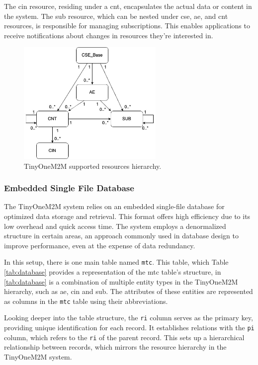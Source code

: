 \documentclass[a4paper,fleqn]{cas-dc}
\begin{document}
The \gls{cin} resource, residing under a \gls{cnt}, encapsulates the actual data or content in the system. The \gls{sub} resource, which can be nested under \gls{cse}, \gls{ae}, and \gls{cnt} resources, is responsible for managing subscriptions. This enables applications to receive notifications about changes in resources they're interested in.

\begin{figure}[htbp]
	\centering
	\includegraphics[width=7cm]{Hierarchy}
	\caption{TinyOneM2M supported resources hierarchy.}
	\label{fig:hierarchy}
\end{figure}

\subsubsection{Embedded Single File Database}

The TinyOneM2M system relies on an embedded single-file database for optimized data storage and retrieval. This format offers high efficiency due to its low overhead and quick access time. The system employs a denormalized structure in certain areas, an approach commonly used in database design to improve performance, even at the expense of data redundancy.

In this setup, there is one main table named \texttt{mtc}. This table, which Table \ref{tab:database} provides a representation of the \gls{mtc} table's structure, in \ref{tab:database} is a combination of multiple entity types in the TinyOneM2M hierarchy, such as \gls{ae}, \gls{cin} and \gls{sub}. The attributes of these entities are represented as columns in the \texttt{mtc} table using their abbreviations.

Looking deeper into the table structure, the \texttt{ri} column serves as the primary key, providing unique identification for each record. It establishes relations with the \texttt{pi} column, which refers to the \texttt{ri} of the parent record. This sets up a hierarchical relationship between records, which mirrors the resource hierarchy in the TinyOneM2M system.
\end{document}
